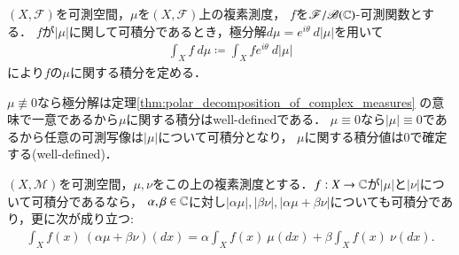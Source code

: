 	\begin{screen}
		\begin{dfn}[複素測度に関する積分]
			$(X,\mathscr{F})$を可測空間，$\mu$を$(X,\mathscr{F})$上の複素測度，
			$f$を$\mathscr{F}/\mathscr{B}(\mathbb{C})$-可測関数とする．
			$f$が$|\mu|$に関して可積分であるとき，極分解$d\mu = e^{i\theta}\ d|\mu|$を用いて
			\begin{align}
				\int_X f\ d\mu \coloneqq \int_X f e^{i \theta}\ d|\mu|
			\end{align}
			により$f$の$\mu$に関する積分を定める．
		\end{dfn}
	\end{screen}
	
	$\mu \not\equiv 0$なら極分解は定理\ref{thm:polar_decomposition_of_complex_measures}
	の意味で一意であるから$\mu$に関する積分はwell-definedである．
	$\mu \equiv 0$なら$|\mu| \equiv 0$であるから任意の可測写像は$|\mu|$について可積分となり，
	$\mu$に関する積分値は0で確定する(well-defined)．
		
	\begin{screen}
		\begin{thm}[積分の測度に関する線型性]
			$(X,\mathcal{M})$を可測空間，$\mu,\nu$をこの上の複素測度とする．$f:X \rightarrow \mathbb{C}$が$|\mu|$と$|\nu|$について可積分であるなら，
			$\alpha,\beta \in \mathbb{C}$に対し$|\alpha \mu|, |\beta \nu|, |\alpha \mu + \beta \nu|$についても可積分であり，更に次が成り立つ:
			\begin{align}
				\int_X f(x)\ (\alpha\mu + \beta\nu)(dx) = \alpha \int_X f(x)\ \mu(dx) + \beta \int_X f(x)\ \nu(dx).
			\end{align}
			\label{thm:linearity_of_integral_respect_to_measure}
		\end{thm}
	\end{screen}
	
